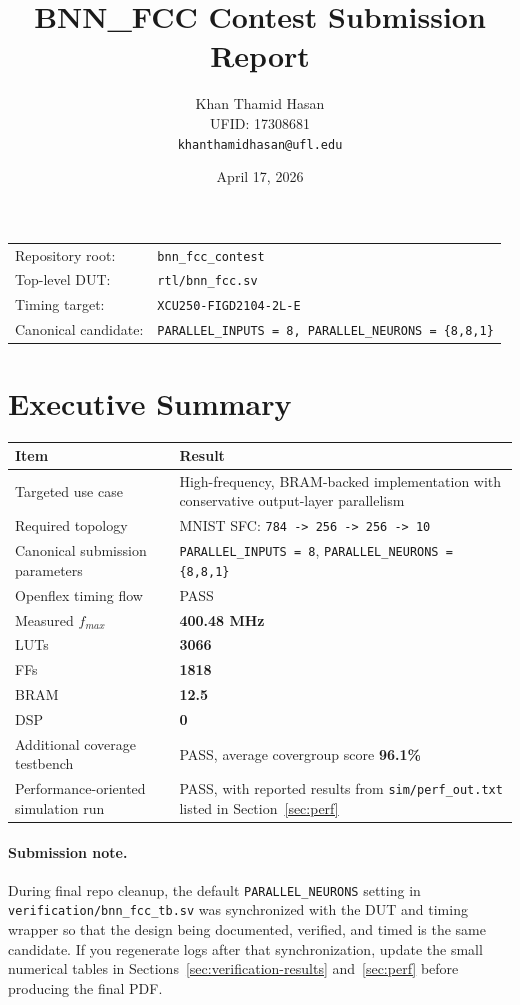 \documentclass[11pt]{article}
\title{\textbf{BNN\_FCC Contest Submission Report}}
\author{
  Khan Thamid Hasan \\
  UFID: 17308681 \\
  \texttt{khanthamidhasan@ufl.edu}
}
\date{April 17, 2026}
\begin{document}
\maketitle
\thispagestyle{empty}

\begin{center}
\begin{tabular}{ll}
Repository root: & \texttt{bnn\_fcc\_contest} \\
Top-level DUT: & \texttt{rtl/bnn\_fcc.sv} \\
Timing target: & \texttt{XCU250-FIGD2104-2L-E} \\
Canonical candidate: & \texttt{PARALLEL\_INPUTS = 8,\ PARALLEL\_NEURONS = \{8,8,1\}} \\
\end{tabular}
\end{center}

\section*{Executive Summary}

\begin{tabularx}{\textwidth}{@{}lY@{}}
\toprule
Item & Result \\
\midrule
Targeted use case & High-frequency, BRAM-backed implementation with conservative output-layer parallelism \\
Required topology & MNIST SFC: \texttt{784 -> 256 -> 256 -> 10} \\
Canonical submission parameters & \texttt{PARALLEL\_INPUTS = 8}, \texttt{PARALLEL\_NEURONS = \{8,8,1\}} \\
Openflex timing flow & PASS \\
Measured $f_{max}$ & \textbf{400.48 MHz} \\
LUTs & \textbf{3066} \\
FFs & \textbf{1818} \\
BRAM & \textbf{12.5} \\
DSP & \textbf{0} \\
Additional coverage testbench & PASS, average covergroup score \textbf{96.1\%} \\
Performance-oriented simulation run & PASS, with reported results from \texttt{sim/perf\_out.txt} listed in Section~\ref{sec:perf} \\
\bottomrule
\end{tabularx}

\paragraph{Submission note.}
During final repo cleanup, the default \texttt{PARALLEL\_NEURONS} setting in \texttt{verification/bnn\_fcc\_tb.sv} was synchronized with the DUT and timing wrapper so that the design being documented, verified, and timed is the same candidate. If you regenerate logs after that synchronization, update the small numerical tables in Sections~\ref{sec:verification-results} and~\ref{sec:perf} before producing the final PDF.
\end{document}
